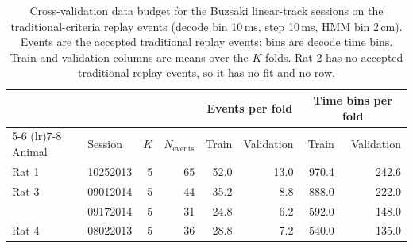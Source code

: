 \begin{table}[htbp]
  \centering
  \begin{tabular}{llrrrrrr}
    \toprule
    & & & & \multicolumn{2}{c}{Events per fold} & \multicolumn{2}{c}{Time bins per fold} \\
    \cmidrule(lr){5-6} \cmidrule(lr){7-8}
    Animal & Session & $K$ & $N_{\mathrm{events}}$ & Train & Validation & Train & Validation \\
    \midrule
    Rat 1 & 10252013 & 5 & 65 & 52.0 & 13.0 & 970.4 & 242.6 \\
    \addlinespace
    Rat 3 & 09012014 & 5 & 44 & 35.2 & 8.8 & 888.0 & 222.0 \\
     & 09172014 & 5 & 31 & 24.8 & 6.2 & 592.0 & 148.0 \\
    \addlinespace
    Rat 4 & 08022013 & 5 & 36 & 28.8 & 7.2 & 540.0 & 135.0 \\
    \bottomrule
  \end{tabular}
  \caption{Cross-validation data budget for the Buzsaki linear-track sessions on the traditional-criteria replay events (decode bin 10\,ms, step 10\,ms, HMM bin 2\,cm). Events are the accepted traditional replay events; bins are decode time bins. Train and validation columns are means over the $K$ folds. Rat 2 has no accepted traditional replay events, so it has no fit and no row.}
  \label{tab:cv-budget-buzsaki-tradreplay}
\end{table}
